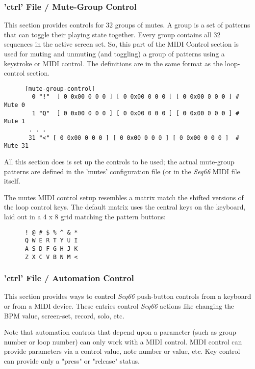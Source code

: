 \subsubsection{'ctrl' File / Mute-Group Control}
\label{subsubsec:configuration_ctrl_mute_group_control}

   This section provides controls for 32 groups of mutes.
   A group is a set of patterns that can toggle their playing state
   together.  Every group contains all 32 sequences in the active screen set.
   So, this part of the MIDI Control section is used for muting and unmuting
   (and toggling) a group of patterns using a keystroke or MIDI control.
   The definitions are in the same format as the loop-control section.

   \begin{verbatim}
      [mute-group-control]
        0 "!"  [ 0 0x00 0 0 0 ] [ 0 0x00 0 0 0 ] [ 0 0x00 0 0 0 ] # Mute 0
        1 "Q"  [ 0 0x00 0 0 0 ] [ 0 0x00 0 0 0 ] [ 0 0x00 0 0 0 ] # Mute 1
       . . .
       31 "<" [ 0 0x00 0 0 0 ] [ 0 0x00 0 0 0 ] [ 0 0x00 0 0 0 ]  # Mute 31
   \end{verbatim}

   All this section does is set up the controls to be used; the actual
   mute-group patterns are defined in the 'mutes' configuration file (or in the
   \textsl{Seq66} MIDI file itself.

   The mutes MIDI control setup resembles a matrix match the shifted versions
   of the loop control keys.  The default matrix
   uses the central keys on the keyboard, laid out in a 4 x 8 grid matching the
   pattern buttons:

   \begin{verbatim}
      ! @ # $ % ^ & *
      Q W E R T Y U I
      A S D F G H J K
      Z X C V B N M <
   \end{verbatim}

\subsubsection{'ctrl' File / Automation Control}
\label{subsubsec:configuration_midi_ctrl_automation}

   This section provides ways to control \textsl{Seq66} push-button controls
   from a keyboard or from a MIDI device.
   These entries control
   \textsl{Seq66} actions like changing the BPM value, screen-set,
   record, solo, etc.

   Note that automation controls that depend upon a parameter (such as group
   number or loop number) can only work with a MIDI control.
   MIDI control can provide parameters via a control value, note number or value,
   etc.
   Key control can provide only a "press" or "release" status.
   
